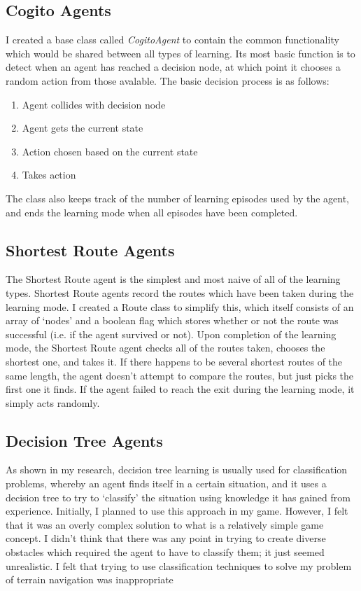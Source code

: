 \documentclass[a4paper,oneside]{report}
\begin{document}
\subsection{Cogito Agents}

I created a base class called \emph{CogitoAgent} to contain the common functionality which would be shared between all types of learning. Its most basic function is to detect when an agent has reached a decision node, at which point it chooses a random action from those avalable. The basic decision process is as follows:

\begin{enumerate}
	\item Agent collides with decision node
	\item Agent gets the current state
	\item Action chosen based on the current state
	\item Takes action
\end{enumerate}

The class also keeps track of the number of learning episodes used by the agent, and ends the learning mode when all episodes have been completed.

\subsection{Shortest Route Agents}

The Shortest Route agent is the simplest and most naive of all of the learning types. Shortest Route agents record the routes which have been taken during the learning mode. I created a Route class to simplify this, which itself consists of an array of `nodes' and a boolean flag which stores whether or not the route was successful (i.e. if the agent survived or not). Upon completion of the learning mode, the Shortest Route agent checks all of the routes taken, chooses the shortest one, and takes it. If there happens to be several shortest routes of the same length, the agent doesn't attempt to compare the routes, but just picks the first one it finds. If the agent failed to reach the exit during the learning mode, it simply acts randomly.

\subsection{Decision Tree Agents}

As shown in my research, decision tree learning is usually used for classification problems, whereby an agent finds itself in a certain situation, and it uses a decision tree to try to `classify' the situation using knowledge it has gained from experience. Initially, I planned to use this approach in my game. However, I felt that it was an overly complex solution to what is a relatively simple game concept. I didn't think that there was any point in trying to create diverse obstacles which required the agent to have to classify them; it just seemed unrealistic. I felt that trying to use classification techniques to solve my problem of terrain navigation was inappropriate
 
\end{document}
